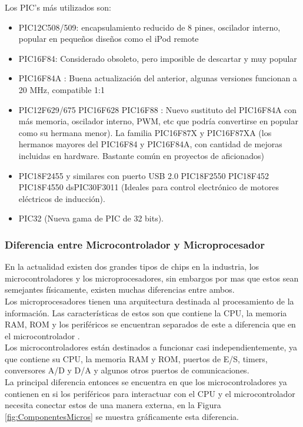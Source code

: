 \documentclass[12pt,a4paper]{article}
\begin{document}
   Los PIC’s más utilizados son:
   \begin{itemize}
   \item PIC12C508/509: encapsulamiento reducido de 8 pines, oscilador interno, popular en pequeños diseños como el iPod remote
   \item PIC16F84: Considerado obsoleto, pero imposible de descartar y muy popular
   \item PIC16F84A : Buena actualización del anterior, algunas versiones funcionan a 20 MHz, compatible 1:1
   \item PIC12F629/675 PIC16F628 PIC16F88 : Nuevo sustituto del PIC16F84A con más memoria, oscilador interno, PWM, etc que podría convertirse en popular como su hermana menor). La familia PIC16F87X y PIC16F87XA (los hermanos mayores del PIC16F84 y PIC16F84A, con cantidad de mejoras incluidas en hardware. Bastante común en proyectos de aficionados)
   \item PIC18F2455 y similares con puerto USB 2.0 PIC18F2550 PIC18F452 PIC18F4550 dsPIC30F3011 (Ideales para control electrónico de motores eléctricos de inducción).
   \item PIC32 (Nueva gama de PIC de 32 bits).
   \end{itemize}
   
   \subsubsection{Diferencia entre Microcontrolador y Microprocesador}
   En la actualidad existen dos grandes tipos de chips en la industria, los microcontroladores y los microprocesadores, sin embargos por mas que estos sean semejantes físicamente, existen muchas diferencias entre ambos.\\
   Los microprocesadores tienen una arquitectura destinada al procesamiento de la información. Las características de estos son que contiene la CPU, la memoria RAM, ROM y los periféricos se encuentran separados de este a diferencia que en el microcontrolador \cite{Carva}.\\
   Los microcontroladores están destinados a funcionar casi independientemente, ya que contiene su CPU, la memoria RAM y ROM, puertos de E/S, timers, conversores A/D y D/A y algunos otros puertos de comunicaciones. \\
   La principal diferencia entonces se encuentra en que los microcontroladores ya contienen en si los periféricos para interactuar con el CPU y el microcontrolador necesita conectar estos de una manera externa, en la Figura  \ref{fig:ComponentesMicros} se muestra gráficamente esta diferencia.\\
   
\end{document}
